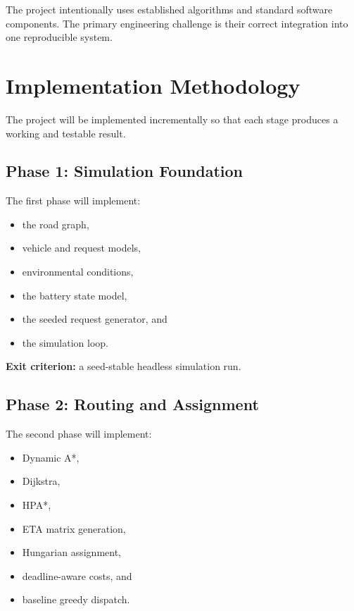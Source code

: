 \documentclass[12pt,a4paper]{article}
\begin{document}
The project intentionally uses established algorithms and standard
software components. The primary engineering challenge is their
correct integration into one reproducible system.





\section{Implementation Methodology}

The project will be implemented incrementally so that each stage
produces a working and testable result.

\subsection{Phase 1: Simulation Foundation}

The first phase will implement:

\begin{itemize}
    \item the road graph,
    \item vehicle and request models,
    \item environmental conditions,
    \item the battery state model,
    \item the seeded request generator, and
    \item the simulation loop.
\end{itemize}

\textbf{Exit criterion:} a seed-stable headless simulation run.

\subsection{Phase 2: Routing and Assignment}

The second phase will implement:

\begin{itemize}
    \item Dynamic A*,
    \item Dijkstra,
    \item HPA*,
    \item ETA matrix generation,
    \item Hungarian assignment,
    \item deadline-aware costs, and
    \item baseline greedy dispatch.
\end{itemize}
\end{document}
